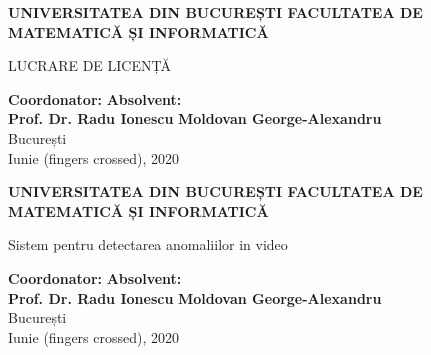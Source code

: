 \documentclass[a4paper,12pt]{report}
\begin{document}
\begin{center}
\pagestyle{empty}
       \vspace*{1cm}

       \textbf{UNIVERSITATEA DIN BUCUREȘTI
FACULTATEA DE MATEMATICĂ ȘI INFORMATICĂ}

       \vspace{0.5cm}
        LUCRARE DE LICENȚĂ
            
       \vfill
           
       \vspace{0.8cm}
\textbf{Coordonator:}
\hfill
\textbf{Absolvent:} \\
\textbf{Prof. Dr. Radu Ionescu}
\hfill
\textbf{Moldovan George-Alexandru} \\

\vspace{0.8cm}
      București \\
Iunie (fingers crossed), 2020
\clearpage         
\end{center}
\newpage

\begin{center}
\pagestyle{empty}
       \vspace*{1cm}

       \textbf{UNIVERSITATEA DIN BUCUREȘTI
FACULTATEA DE MATEMATICĂ ȘI INFORMATICĂ}

       \vspace{0.5cm}
        Sistem pentru detectarea anomaliilor in video
            
       \vfill
           
       \vspace{0.8cm}
\textbf{Coordonator:}
\hfill
\textbf{Absolvent:} \\
\textbf{Prof. Dr. Radu Ionescu}
\hfill
\textbf{Moldovan George-Alexandru} \\
    
\vspace{0.8cm}  
	București \\
Iunie (fingers crossed), 2020
\clearpage
\end{center}
\newpage
\end{document}
